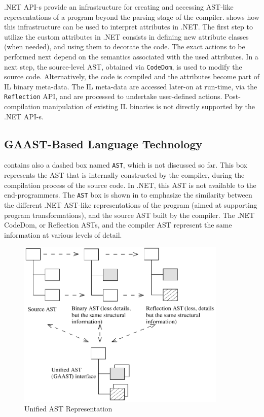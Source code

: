 .NET API-s provide an infrastructure for creating and accessing AST-like representations of a program beyond the parsing stage of the compiler.  shows how this infrastructure can be used to interpret attributes in .NET. The first step to utilize the custom attributes in .NET consists in defining new attribute classes (when needed), and using them to decorate the code. The exact actions to be performed next depend on the semantics associated with the used attributes. In a next step, the source-level AST, obtained via  \texttt{CodeDom}, is used to modify the source code. Alternatively, the code is compiled and the attributes become part of IL binary meta-data. The IL meta-data are accessed later-on at run-time, via the {\tt Reflection} API, and are processed to undertake user-defined actions. Post-compilation manipulation of existing IL binaries is not directly supported by the .NET API-s.

\subsection{GAAST-Based Language Technology}
\label{sec.gaast}

 contains also a dashed box named {\tt AST}, which is not discussed so far. This box represents the AST that is internally constructed by the compiler, during the compilation process of the source code. In .NET, this AST is not available to the end-programmers. The {\tt AST} box is shown in  to emphasize the similarity between the different .NET AST-like representations of the program (aimed at supporting program transformations), and the source AST built by the compiler. The .NET CodeDom, or Reflection ASTs, and the compiler AST represent the same information at various levels of detail.

\begin{figure}[ht]
	\begin{center}
		\includegraphics[width=10cm,height=!]{ch03/gaast}
	\end{center}
	\caption{Unified AST Representation}
	\label{fig.gaast}
\end{figure}

